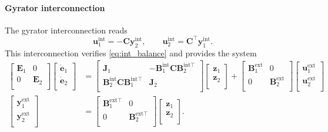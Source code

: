 \documentclass{svjour3}                     %
\begin{document}
	\paragraph{Gyrator interconnection}
	The gyrator interconnection reads
	\begin{equation*}
	\mathbf{u}_1^{\text{int}} = -\mathbf{C} \mathbf{y}_2^{\text{int}}, \qquad
	\mathbf{u}_2^{\text{int}} = \mathbf{C}^\top \mathbf{y}_1^{\text{int}}.
	\end{equation*}
	This interconnection verifies \eqref{eq:int_balance} and provides the system
	\begin{align*}
	\begin{bmatrix}
	\mathbf{E}_1 & 0 \\ 0 & \mathbf{E}_2 \\
	\end{bmatrix}
	\begin{bmatrix}
	\dot{\mathbf{e}}_1 \\ \dot{\mathbf{e}}_2 \\
	\end{bmatrix} &= 
	\begin{bmatrix}
	\mathbf{J}_1 & -\mathbf{B}_1^{\text{int}} \mathbf{C} \mathbf{B}_2^{\text{int} \top} \\ 
	\mathbf{B}_2^{\text{int}} \mathbf{C} \mathbf{B}_1^{\text{int} \top}  & \mathbf{J}_2 \\
	\end{bmatrix}
	\begin{bmatrix}
	\mathbf{z}_1 \\ 
	\mathbf{z}_2 \\
	\end{bmatrix}+ 
	\begin{bmatrix}
	\mathbf{B}_1^{\text{ext}} & 0 \\ 0 & \mathbf{B}_2^{\text{ext}} \\
	\end{bmatrix} 
	\begin{bmatrix}
	\mathbf{u}_1^{\text{ext}} \\ \mathbf{u}_2^{\text{ext}} \\
	\end{bmatrix}  \\
	\begin{bmatrix}
	\mathbf{y}_1^{\text{ext}} \\ \mathbf{y}_2^{\text{ext}} \\
	\end{bmatrix}  &= \begin{bmatrix}
	\mathbf{B}_1^{\text{ext} \top} & 0 \\
	0 & \mathbf{B}_2^{\text{ext} \top} \\
	\end{bmatrix} \begin{bmatrix}
	\mathbf{z}_1 \\ 
	\mathbf{z}_2 \\
	\end{bmatrix}.
	\end{align*}
	
\end{document}

